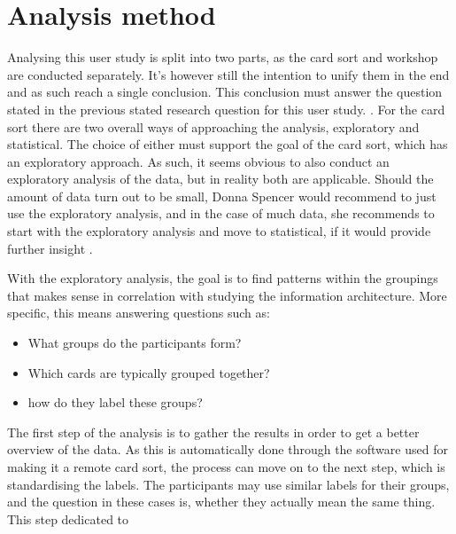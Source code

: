 \section{Analysis method}
\label{AnalysisMethod}
Analysing this user study is split into two parts, as the card sort and workshop are conducted separately. It's however still the intention to unify them in the end and as such reach a single conclusion. This conclusion must answer the question stated in the previous stated research question for this user study. . For the card sort there are two overall ways of approaching the analysis, exploratory and statistical. The choice of either must support the goal of the card sort, which has an exploratory approach. As such, it seems obvious to also conduct an exploratory analysis of the data, but in reality both are applicable. Should the amount of data turn out to be small, Donna Spencer would recommend to just use the exploratory analysis, and in the case of much data, she recommends to start with the exploratory analysis and move to statistical, if it would provide further insight \parencite[][177]{WEB:DonnaSpencer}.

With the exploratory analysis, the goal is to find patterns within the groupings that makes sense in correlation with studying the information architecture. More specific, this means answering questions such as:
%
\begin{itemize}
	\item What groups do the participants form?
	\item Which cards are typically grouped together?
	\item how do they label these groups?
\end{itemize}
%
\noindent
The first step of the analysis is to gather the results in order to get a better overview of the data. As this is automatically done through the software used for making it a remote card sort, the process can move on to the next step, which is standardising the labels. The participants may use similar labels for their groups, and the question in these cases is, whether they actually mean the same thing. This step dedicated to 








